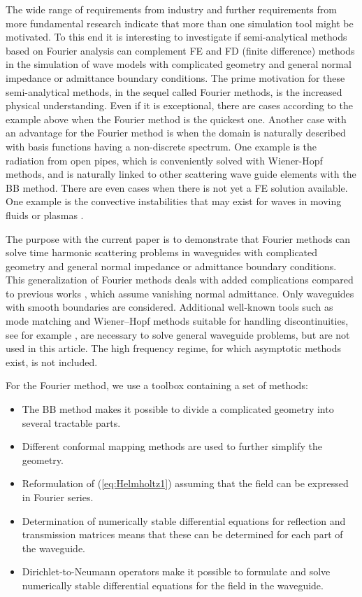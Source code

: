 \documentclass[numreferences]{kluwer}
\begin{document}
The wide range of requirements from industry and further requirements
from more fundamental research indicate that more than one simulation
tool might be motivated. To this end it is interesting to investigate
if semi-analytical methods based on Fourier analysis can complement FE
and FD (finite difference) methods in the simulation of wave models
with complicated geometry and general normal impedance or admittance
boundary conditions. The prime motivation for these semi-analytical
methods, in the sequel called Fourier methods, is the increased
physical understanding. Even if it is exceptional, there are cases
according to the example above when the Fourier method is the
quickest one. Another case with an advantage for the Fourier
method is when the domain is naturally described with basis functions
having a non-discrete spectrum. One example is the radiation from
open pipes, which is conveniently solved with Wiener-Hopf methods, and
is naturally linked to other scattering wave guide elements with the
BB method. There are even cases when there is not yet a FE solution
available. One example is the convective instabilities that may exist
for waves in moving fluids \cite{nilssonbrander1980a} or plasmas
\cite{briggs1964}.

The purpose with the current paper is to demonstrate that Fourier
methods can solve time harmonic scattering problems in waveguides with
complicated geometry and general normal impedance or admittance
boundary conditions. This generalization of Fourier methods deals with
added complications compared to previous works
\cite{maurel+mercier+felix:2014,Nilsson:2002}, which assume vanishing
normal admittance. Only waveguides with smooth boundaries are
considered. Additional well-known tools such as mode matching and
Wiener--Hopf methods suitable for handling discontinuities, see for
example \cite{jones1986}, are necessary to solve general waveguide
problems, but are not used in this article. The high frequency regime,
for which asymptotic methods exist, is not included.

For the Fourier method, we use a toolbox containing a set of
methods:
\begin{itemize}
\item The BB method makes it possible to divide a complicated geometry
  into several tractable parts.
\item Different conformal mapping methods are used to further simplify
  the geometry.
\item Reformulation of (\ref{eq:Helmholtz1}) assuming that the field
  can be expressed in Fourier series.
\item Determination of numerically stable differential equations for
  reflection and transmission matrices means that these can be
  determined for each part of the waveguide.
\item Dirichlet-to-Neumann operators make it possible to formulate and
  solve numerically stable differential equations for the field in the
  waveguide.
\end{itemize}
\end{document}
